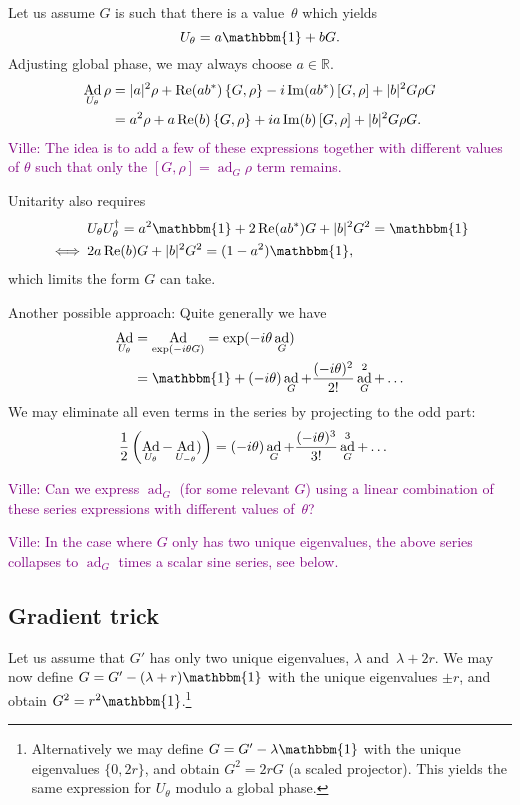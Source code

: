 \documentclass[aps,pra,10pt,twocolumn,groupedaddress,nofootinbib]{revtex4-1}
\theoremstyle{plain}
\DeclareMathOperator{\re}{Re}
\DeclareMathOperator{\im}{Im}
\DeclareMathOperator{\Ad}{Ad}
\DeclareMathOperator{\ad}{ad}
\newcommand{\be}{\begin{equation}}
\newcommand{\ee}{\end{equation}}
\newcommand{\R}{\ensuremath{\mathbb R}}  %
\newcommand{\I}{\mathbbm{1}} %
\newcommand{\comm}[2]{\ensuremath{\left[#1, #2\right]}}             %
\newcommand{\acomm}[2]{\ensuremath{\left\{#1, #2\right\}}}          %
\newcommand{\ville}[1]{\textcolor{purple}{Ville: #1}}
\begin{document}
Let us assume $G$ is such that there is a value~$\theta$ which yields
\be
\label{eq:U_IG}
U_\theta = a\I +bG.
\ee
Adjusting global phase, we may always choose $a \in \R$.
\begin{align}
\label{eq:AdUtheta}
\notag
\Ad_{U_\theta} \rho &=
|a|^2 \rho +\re(ab^*)\acomm{G}{\rho}
-i\im(ab^*)\comm{G}{\rho} +|b|^2 G\rho G\\
&=
a^2 \rho +a\re(b)\acomm{G}{\rho}
+ia\im(b)\comm{G}{\rho} +|b|^2 G\rho G.
\end{align}
\ville{The idea is to add a few of these expressions together with different values of $\theta$
such that only the $\comm{G}{\rho} = \ad_G \rho$ term remains.}

Unitarity also requires
\begin{align}
\notag
&U_\theta U_\theta^\dagger = a^2\I +2\re(ab^*) G +|b|^2 G^2 = \I\\
\iff \:&
2a\re(b) G +|b|^2 G^2 = (1-a^2)\I,
\end{align}
which limits the form $G$ can take.

Another possible approach:
Quite generally we have
\begin{align}
\notag
\Ad_{U_\theta}
&= \Ad_{\exp(-i \theta G)}
= \exp(-i \theta \ad_{G})\\
&= \I +(-i\theta)\ad_G +\frac{(-i\theta)^2}{2!} \ad_G^2 +\ldots
\end{align}
We may eliminate all even terms in the series by projecting to the odd part:
\begin{align}
\notag
\frac{1}{2}\left(\Ad_{U_\theta} -\Ad_{U_{-\theta}})\right)
&= (-i\theta)\ad_G +\frac{(-i\theta)^3}{3!} \ad_G^3 +\ldots
\end{align}


\ville{Can we express $\ad_G$ (for some relevant $G$) using a linear combination of these series expressions with different values of~$\theta$?}

\ville{In the case where $G$ only has two unique eigenvalues, the above series collapses to $\ad_G$ times a scalar sine series, see below.}

\subsection{Gradient trick}
\label{sec:gradient_trick}

Let us assume that $G'$ has only two unique eigenvalues, $\lambda$ and~$\lambda+2r$.
We may now define $G = G' -(\lambda+r)\I$ with the unique eigenvalues
$\pm r$, and obtain $G^2 = r^2\I$.\footnote{
Alternatively we may define $G = G' -\lambda \I$ with the unique eigenvalues
$\{0, 2r\}$, and obtain $G^2 = 2r G$ (a scaled projector).
This yields the same expression for $U_\theta$ modulo a global phase.}
\end{document}
